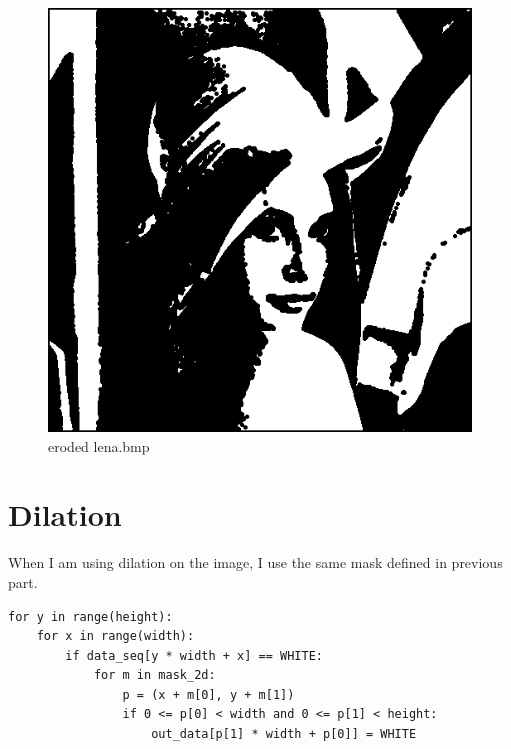 \documentclass[14pt,a4paper]{extarticle}
\begin{document}
\begin{figure}[H]
\centering
\includegraphics[scale=0.6]{lena-eroded.bmp}
\caption{eroded lena.bmp}
\label{fig:lena-eroded.bmp}
\end{figure}

\section*{Dilation}

When I am using dilation on the image, I use the same mask defined in previous part.

\begin{lstlisting}[caption=Dilation]
for y in range(height):
    for x in range(width):
        if data_seq[y * width + x] == WHITE:
            for m in mask_2d:
                p = (x + m[0], y + m[1])
                if 0 <= p[0] < width and 0 <= p[1] < height:
                    out_data[p[1] * width + p[0]] = WHITE
\end{lstlisting}
\end{document}
